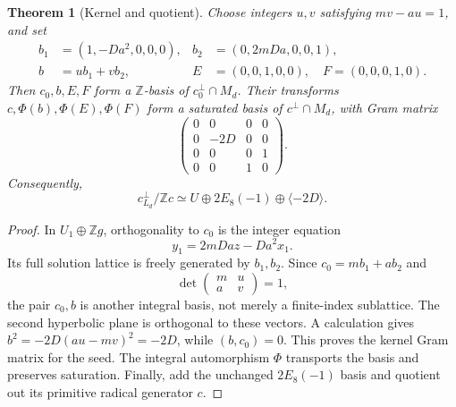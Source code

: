 \documentclass[11pt]{article}
\newtheorem{theorem}{Theorem}[section]
\theoremstyle{remark}\newtheorem{remark}[theorem]{Remark}
\newcommand{\Z}{\mathbb Z}\newcommand{\Q}{\mathbb Q}\newcommand{\R}{\mathbb R}
\begin{document}
\begin{theorem}[Kernel and quotient]\label{thm:quotient}
Choose integers $u,v$ satisfying $mv-au=1$, and set
\begin{align*}
 b_1&=(1,-Da^2,0,0,0),& b_2&=(0,2mDa,0,0,1),\\
 b&=u b_1+v b_2,& E&=(0,0,1,0,0),\quad F=(0,0,0,1,0).
\end{align*}
Then $c_0,b,E,F$ form a $\Z$-basis of $c_0^\perp\cap M_d$. Their transforms $c,\Phi(b),\Phi(E),\Phi(F)$ form a saturated basis of $c^\perp\cap M_d$, with Gram matrix
\begin{equation}\label{eq:kernelgram}
 \begin{pmatrix}0&0&0&0\\0&-2D&0&0\\0&0&0&1\\0&0&1&0\end{pmatrix}.
\end{equation}
Consequently,
\begin{equation}\label{eq:quotient}
 c^\perp_{L_d}/\Z c\simeq U\oplus2E_8(-1)\oplus\langle-2D\rangle.
\end{equation}
\end{theorem}
\begin{proof}
In $U_1\oplus\Z g$, orthogonality to $c_0$ is the integer equation
\[
 y_1=2mDa z-Da^2x_1.
\]
Its full solution lattice is freely generated by $b_1,b_2$. Since $c_0=mb_1+ab_2$ and
\[
 \det\begin{pmatrix}m&u\\a&v\end{pmatrix}=1,
\]
the pair $c_0,b$ is another integral basis, not merely a finite-index sublattice. The second hyperbolic plane is orthogonal to these vectors. A calculation gives $b^2=-2D(au-mv)^2=-2D$, while $(b,c_0)=0$. This proves the kernel Gram matrix for the seed. The integral automorphism $\Phi$ transports the basis and preserves saturation. Finally, add the unchanged $2E_8(-1)$ basis and quotient out its primitive radical generator $c$.
\end{proof}
\end{document}
